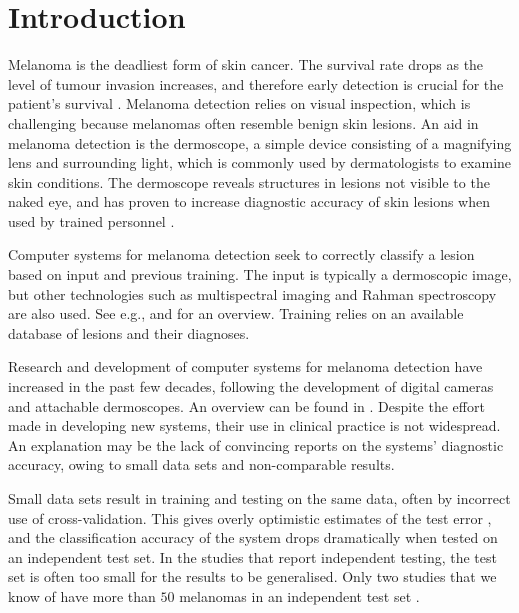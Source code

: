 \documentclass[a4paper,12pt]{article}
\begin{document}
\newpage

\section{Introduction}

Melanoma is the deadliest form of skin cancer. The survival rate drops as the level of tumour invasion increases, and therefore early detection is crucial for the patient's survival \citep{AmericanCancerSociety2016Cancer, CancerRegistryofNorway2016Cancer}. Melanoma detection relies on visual inspection, which is challenging because melanomas often resemble benign skin lesions. An aid in melanoma detection is the dermoscope, a simple device consisting of a magnifying lens and surrounding light, which is commonly used by dermatologists to examine skin conditions. The dermoscope reveals structures in lesions not visible to the naked eye, and has proven to increase diagnostic accuracy of skin lesions when used by trained personnel \citep{Kittler2002Diagnostic}.

Computer systems for melanoma detection seek to correctly classify a lesion based on input and previous training. The input is typically a dermoscopic image, but other technologies such as multispectral imaging and Rahman spectroscopy are also used. See e.g., \cite{Fink2016Noninvasive} and \cite{Masood2013Computer} for an overview. Training relies on an available database of lesions and their diagnoses. 

Research and development of computer systems for melanoma detection have increased in the past few decades, following the development of digital cameras and attachable dermoscopes. An overview can be found in \cite{Korotkov2012Computerized}. Despite the effort made in developing new systems, their use in clinical practice is not widespread. An explanation may be the lack of convincing reports on the systems' diagnostic accuracy, owing to small data sets and non-comparable results. 

Small data sets result in training and testing on the same data, often by incorrect use of cross-validation. This gives overly optimistic estimates of the test error \citep{Smialowski2010Pitfalls,Hastie2009Elements}, and the classification accuracy of the system drops dramatically when tested on an independent test set. In the studies that report independent testing, the test set is often too small for the results to be generalised. Only two studies that we know of have more than $50$ melanomas in an independent test set \citep{Monheit2011Performance, Malvehy2014Clinical}. 
\end{document}
